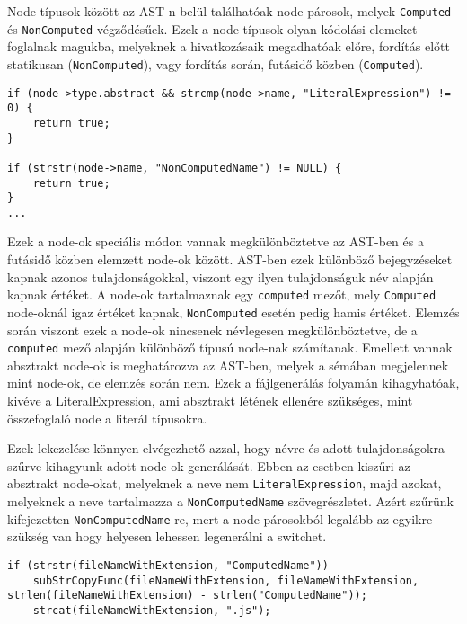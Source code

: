Node típusok között az AST-n belül találhatóak node párosok, melyek \texttt{Computed} és \texttt{NonComputed} végződésűek. Ezek a node típusok olyan kódolási elemeket foglalnak magukba, melyeknek a hivatkozásaik megadhatóak előre, fordítás előtt statikusan (\texttt{NonComputed}), vagy fordítás során, futásidő közben (\texttt{Computed}).

\pagebreak

\begin{lstlisting}[caption={Absztrakt és speciális node szűrés},label={lst:abs-computedfiltering}, style={CStyle}]
if (node->type.abstract && strcmp(node->name, "LiteralExpression") != 0) {
    return true;
}

if (strstr(node->name, "NonComputedName") != NULL) {
    return true;
}
...
\end{lstlisting}

Ezek a node-ok speciális módon vannak megkülönböztetve az AST-ben és a futásidő közben elemzett node-ok között. AST-ben ezek különböző bejegyzéseket kapnak azonos tulajdonságokkal, viszont egy ilyen tulajdonságuk név alapján kapnak értéket. A node-ok tartalmaznak egy \texttt{computed} mezőt, mely \texttt{Computed} node-oknál igaz értéket kapnak, \texttt{NonComputed} esetén pedig hamis értéket. Elemzés során viszont ezek a node-ok nincsenek névlegesen megkülönböztetve, de a \texttt{computed} mező alapján különböző típusú node-nak számítanak.
Emellett vannak absztrakt node-ok is meghatározva az AST-ben, melyek a sémában megjelennek mint node-ok, de elemzés során nem. Ezek a fájlgenerálás folyamán kihagyhatóak, kivéve a LiteralExpression, ami absztrakt létének ellenére szükséges, mint összefoglaló node a literál típusokra.

Ezek lekezelése könnyen elvégezhető azzal, hogy névre és adott tulajdonságokra szűrve kihagyunk adott node-ok generálását. 
Ebben az esetben kiszűri az absztrakt node-okat, melyeknek a neve nem \texttt{LiteralExpression}, majd azokat, melyeknek a neve tartalmazza a \texttt{NonComputedName} szövegrészletet. Azért szűrünk kifejezetten \texttt{NonComputedName}-re, mert a node párosokból legalább az egyikre szükség van hogy helyesen lehessen legenerálni a switchet.

\begin{lstlisting}[caption={Computed és NonComputed node-ok kezelése},label={lst:abs-compnoncomp}, style={CStyle}]
if (strstr(fileNameWithExtension, "ComputedName")) 
    subStrCopyFunc(fileNameWithExtension, fileNameWithExtension, strlen(fileNameWithExtension) - strlen("ComputedName"));
    strcat(fileNameWithExtension, ".js");
\end{lstlisting}


